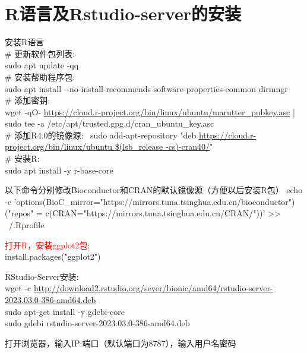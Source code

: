 \documentclass[10pt,a4paper]{article}
\begin{document}
\section{\rm{R}语言及\textrm{Rstudio-server}的安装}
安装\textrm{R}语言\\ 
\# 更新软件包列表:~\\
\textrm{sudo apt update -qq}\\
\# 安装帮助程序包:~\\
\textrm{sudo apt install -\/-no-install-recommends software-properties-common dirmngr}\\
\# 添加密钥:~\\
\textrm{wget -qO- \url{https://cloud.r-project.org/bin/linux/ubuntu/marutter_pubkey.asc} | sudo tee -a /etc/apt/trusted.gpg.d/cran\_ubuntu\_key.asc}\\
\# 添加R4.0的镜像源:~
\textrm{sudo add-apt-repository "deb \url{https://cloud.r-project.org/bin/linux/ubuntu \$(lsb\_release -cs)-cran40/}"}\\
\# 安装\textrm{R}:\\
\textrm{sudo apt install -y r-base-core}

以下命令分别修改\textrm{Bioconductor}和\textrm{CRAN}的默认镜像源（方便以后安装\textrm{R}包）
\textrm{echo -e 'options(BioC\_mirror="\textrm{https://mirrors.tuna.tsinghua.edu.cn/bioconductor}")\noptions("repos" = c(CRAN="\textrm{https://mirrors.tuna.tsinghua.edu.cn/CRAN/}"))' >> ~/.Rprofile}

\textcolor{red}{打开\textrm{R}，安装\textrm{ggplot2}包}:~\\
\textrm{install.packages("ggplot2")}

\textrm{RStudio-Server}安装:\\
\textrm{wget -c \url{http://download2.rstudio.org/sever/bionic/amd64/rstudio-server-2023.03.0-386-amd64.deb}}\\
\textrm{sudo apt-get install -y gdebi-core}\\
\textrm{sudo gdebi rstudio-server-2023.03.0-386-amd64.deb}

打开浏览器，输入\textrm{IP}:端口（默认端口为\textrm{8787}），输入用户名密码
\end{document}
